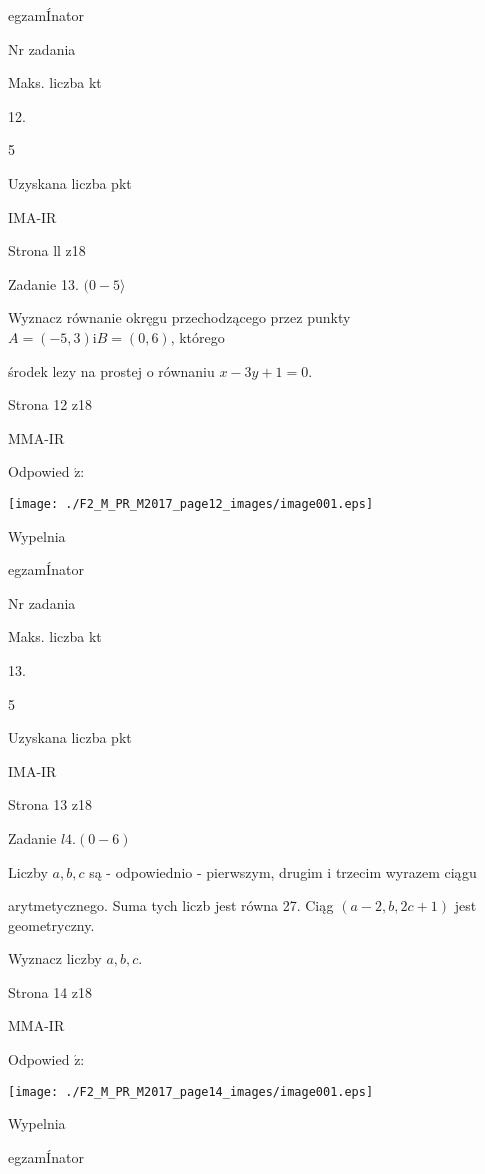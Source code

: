 \documentclass[a4paper,12pt]{article}
\begin{document}
egzamÍnator

Nr zadania

Maks. liczba kt

12.

5

Uzyskana liczba pkt

IMA-IR

Strona ll z18





Zadanie 13. $(0-5\rangle$

Wyznacz równanie okręgu przechodzącego przez punkty $A=(-5,3) \mathrm{i} B=(0,6)$, którego

środek lezy na prostej o równaniu $x-3y+1=0.$

Strona 12 z18

MMA-IR





Odpowied $\acute{\mathrm{z}}$:
\begin{center}
\texttt{[image: ./F2\_M\_PR\_M2017\_page12\_images/image001.eps]}
\end{center}
Wypelnia

egzamÍnator

Nr zadania

Maks. liczba kt

13.

5

Uzyskana liczba pkt

IMA-IR

Strona 13 z18





Zadanie $l4. (0-6)$

Liczby $a, b, c$ są - odpowiednio - pierwszym, drugim i trzecim wyrazem ciągu

arytmetycznego. Suma tych liczb jest równa 27. Ciąg $(a-2,b,2c+1)$ jest geometryczny.

Wyznacz liczby $a, b, c.$

Strona 14 z18

MMA-IR





Odpowied $\acute{\mathrm{z}}$:
\begin{center}
\texttt{[image: ./F2\_M\_PR\_M2017\_page14\_images/image001.eps]}
\end{center}
Wypelnia

egzamÍnator
\end{document}
